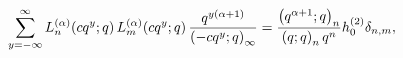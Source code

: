\[\sum_{y=-\infty}^{\infty}\mathop{L^{(\alpha)}_{n}\/}\nolimits\!\left(cq^{y};q%
\right)\mathop{L^{(\alpha)}_{m}\/}\nolimits\!\left(cq^{y};q\right)\frac{q^{y(%
\alpha+1)}}{\left(-cq^{y};q\right)_{\infty}}=\frac{\left(q^{\alpha+1};q\right)%
_{n}}{\left(q;q\right)_{n}q^{n}}h_{0}^{(2)}\delta_{n,m},\]